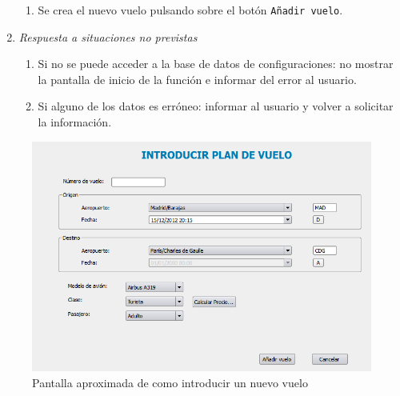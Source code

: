 \begin{enumerate}
\begin{enumerate}
				\item Se crea el nuevo vuelo pulsando sobre el botón \verb|Añadir vuelo|.
			\end{enumerate}
		\item \textit{Respuesta a situaciones no previstas}
			\begin{enumerate}
				\item Si no se puede acceder a la base de datos de configuraciones: no mostrar la pantalla de inicio de la función e informar del error al usuario.
				\item Si alguno de los datos es erróneo: informar al usuario y volver a solicitar la información.
			\end{enumerate}
	\end{enumerate}
	\begin{figure}[ht]\centering
	\includegraphics[scale=.6]{imagenes/introducirPlanDeVueloImagen.png}
	\caption{Pantalla aproximada de como introducir un nuevo vuelo}
\end{figure}
